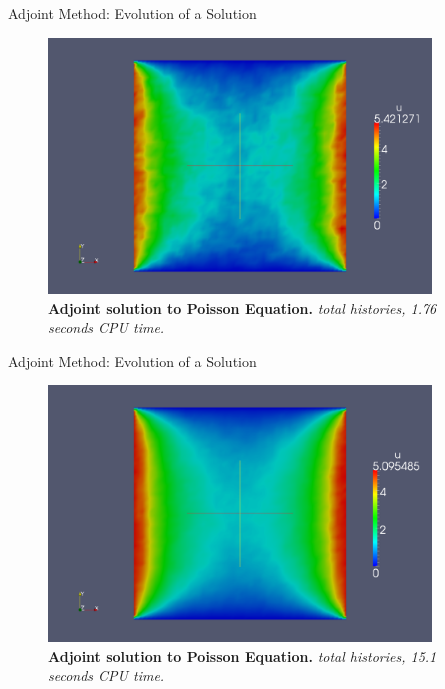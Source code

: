 \documentclass{beamer}
\begin{document}
\begin{frame}{Adjoint Method: Evolution of a Solution}

  \begin{figure}[h!]
    \begin{center}
      \includegraphics[width=4in]{adjoint_100000.png}
    \end{center}
    \caption{\textbf{Adjoint solution to Poisson Equation.}
      \textit{ total histories, 1.76 seconds CPU time.} }
  \end{figure}

\end{frame}

\begin{frame}{Adjoint Method: Evolution of a Solution}

  \begin{figure}[h!]
    \begin{center}
      \includegraphics[width=4in]{adjoint_1000000.png}
    \end{center}
    \caption{\textbf{Adjoint solution to Poisson Equation.}
      \textit{ total histories, 15.1 seconds CPU time.} }
  \end{figure}

\end{frame}
\end{document}
